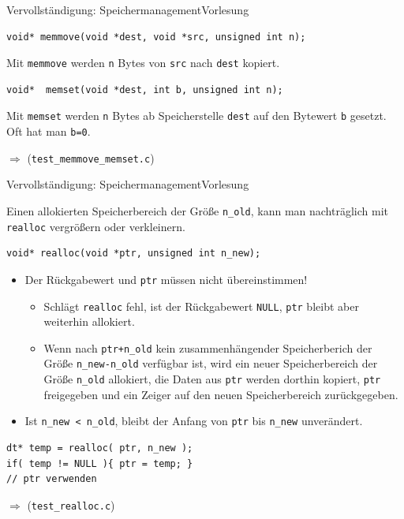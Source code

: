 \documentclass[xcolor=dvipsnames]{beamer}
\newcounter{lecturecounter}
\begin{document}
\begin{frame}[fragile]{Vervollständigung: Speichermanagement}{Vorlesung }
\begin{lstlisting}
void* memmove(void *dest, void *src, unsigned int n);
\end{lstlisting}
  \begin{block}{}
    Mit \texttt{memmove} werden \texttt{n} Bytes von \texttt{src} nach \texttt{dest} kopiert.
  \end{block}

\begin{lstlisting}
void*  memset(void *dest, int b, unsigned int n);
\end{lstlisting}
  \begin{block}{}
    Mit \texttt{memset} werden \texttt{n} Bytes ab Speicherstelle \verb|dest| auf den Bytewert \verb|b| gesetzt. Oft hat man \verb|b=0|.
  \end{block}
  $\Rightarrow$ (\verb|test_memmove_memset.c|)
\end{frame}

\begin{frame}[fragile]{Vervollständigung: Speichermanagement}{Vorlesung }
\begin{block}{}
  Einen allokierten Speicherbereich der Größe \verb|n_old|, kann man nachträglich mit \verb|realloc| vergrößern oder verkleinern.
\end{block}
\begin{lstlisting}
void* realloc(void *ptr, unsigned int n_new);
\end{lstlisting}
\begin{itemize}
  \item{Der Rückgabewert und \verb|ptr| müssen nicht übereinstimmen!}
  \begin{itemize}
    \item{Schlägt \verb|realloc| fehl, ist der Rückgabewert \verb|NULL|, \verb|ptr| bleibt aber weiterhin allokiert.}
    \item{Wenn nach \verb|ptr+n_old| kein zusammenhängender Speicherberich der Größe \verb|n_new-n_old| verfügbar ist, wird ein neuer Speicherbereich der Größe \verb|n_old| allokiert, die Daten aus \verb|ptr| werden dorthin kopiert, \verb|ptr| freigegeben und ein Zeiger auf den neuen Speicherbereich zurückgegeben.}
  \end{itemize}
  \item{Ist \verb|n_new < n_old|, bleibt der Anfang von \verb|ptr| bis \verb|n_new| unverändert.}
\end{itemize}
\begin{lstlisting}
dt* temp = realloc( ptr, n_new );
if( temp != NULL ){ ptr = temp; }
// ptr verwenden
\end{lstlisting}
  
  $\Rightarrow$ (\verb|test_realloc.c|)
\end{frame}
\end{document}
